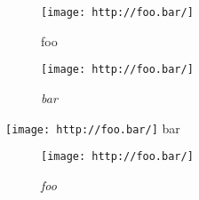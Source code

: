 
\def\mytitle{Figure Images}


\begin{figure}[htbp]
\centering
\texttt{[image: http://foo.bar/]}
\caption{foo}
\label{foo}
\end{figure}

\begin{figure}[htbp]
\centering
\texttt{[image: http://foo.bar/]}
\caption{\emph{bar}}
\label{foo}
\end{figure}

\texttt{[image: http://foo.bar/]} bar

\begin{figure}[htbp]
\centering
\texttt{[image: http://foo.bar/]}
\caption{\emph{foo}}
\end{figure}



